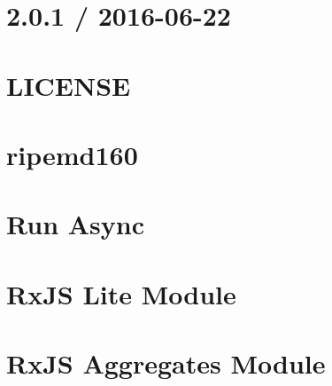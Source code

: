 \documentclass[twoside]{book}
\newcommand{\+}{\discretionary{\mbox{\scriptsize$\hookleftarrow$}}{}{}}
\begin{document}
\chapter{2.0.1 / 2016-\/06-\/22}
\label{md__c_1_workspace_demo_src_main_script_node_modules_ripemd160__c_h_a_n_g_e_l_o_g}

\chapter{L\+I\+C\+E\+N\+SE}
\label{md__c_1_workspace_demo_src_main_script_node_modules_ripemd160__l_i_c_e_n_s_e}

\chapter{ripemd160}
\label{md__c_1_workspace_demo_src_main_script_node_modules_ripemd160__r_e_a_d_m_e}

\chapter{Run Async}
\label{md__c_1_workspace_demo_src_main_script_node_modules_run-async__r_e_a_d_m_e}

\chapter{Rx\+JS Lite Module}
\label{md__c_1_workspace_demo_src_main_script_node_modules_rx-lite_readme}

\chapter{Rx\+JS Aggregates Module}
\label{md__c_1_workspace_demo_src_main_script_node_modules_rx-lite-aggregates_readme}

\end{document}
